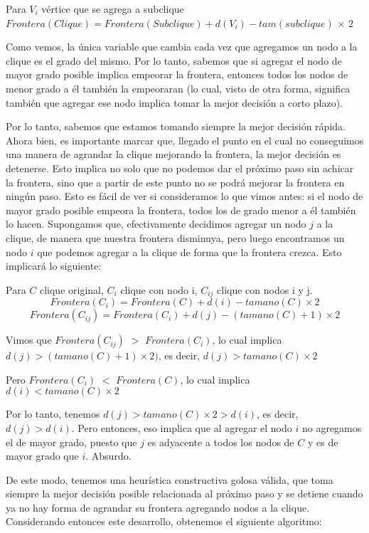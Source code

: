 \begin{center}
Para $V_i$ vértice que se agrega a subclique
$Frontera(Clique) = Frontera(Subclique) + d(V_i) - tam(subclique)$ $\times$ $2$
\end{center}

Como vemos, la única variable que cambia cada vez que agregamos un nodo a la clique es el grado del mismo. Por lo tanto, sabemos que si agregar el nodo de mayor grado posible implica empeorar la frontera, entonces todos los nodos de menor grado a él también la empeoraran (lo cual, visto de otra forma, significa también que agregar ese nodo implica tomar la mejor decisión a corto plazo).

Por lo tanto, sabemos que estamos tomando siempre la mejor decisión rápida. Ahora bien, es importante marcar que, llegado el punto en el cual no conseguimos una manera de agrandar la clique mejorando la frontera, la mejor decisión es detenerse. Esto implica no solo que no podemos dar el próximo paso sin achicar la frontera, sino que a partir de este punto no se podrá mejorar la frontera en ningún paso. Esto es fácil de ver si consideramos lo que vimos antes: si el nodo de mayor grado posible empeora la frontera, todos los de grado menor a él también lo hacen. Supongamos que, efectivamente decidimos agregar un nodo $j$ a la clique, de manera que nuestra frontera disminuya, pero luego encontramos un nodo $i$ que podemos agregar a la clique de forma que la frontera crezca. Esto implicará lo siguiente:

\begin{center}
Para $C$ clique original, $C_i$ clique con nodo i, $C_{ij}$ clique con nodos i y j.
$$Frontera(C_i) = Frontera(C) + d(i) - tamano(C) \times 2$$
$$Frontera(C_{ij}) = Frontera(C_i) + d(j) - (tamano(C) + 1) \times 2$$

Vimos que $Frontera(C_{ij})$ $>$ $Frontera(C_i)$, lo cual implica $d(j) > (tamano(C) + 1) \times 2)$, es decir, $d(j) > tamano(C) \times 2$

Pero $Frontera(C_i)$ $<$ $Frontera(C)$, lo cual implica $d(i) < tamano(C) \times 2$ 

Por lo tanto, tenemos $d(j) > tamano(C) \times 2 > d(i)$, es decir, $d(j) > d(i)$. Pero entonces, eso implica que al agregar el nodo $i$ no agregamos el de mayor grado, puesto que $j$ es adyacente a todos los nodos de $C$ y es de mayor grado que $i$. Absurdo.
\end{center}

De este modo, tenemos una heurística constructiva golosa válida, que toma siempre la mejor decisión posible relacionada al próximo paso y se detiene cuando ya no hay forma de agrandar su frontera agregando nodos a la clique. Considerando entonces este desarrollo, obtenemos el siguiente algoritmo:

